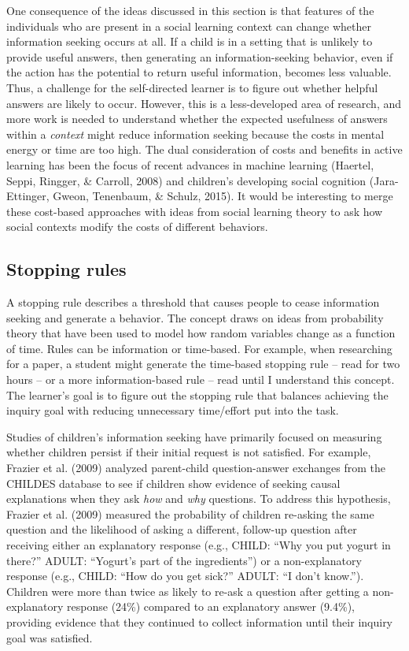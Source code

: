 \documentclass[english,floatsintext,man]{apa6}
\theoremstyle{definition}
\theoremstyle{definition}
\theoremstyle{definition}
\theoremstyle{remark}
\begin{document}
One consequence of the ideas discussed in this section is that features
of the individuals who are present in a social learning context can
change whether information seeking occurs at all. If a child is in a
setting that is unlikely to provide useful answers, then generating an
information-seeking behavior, even if the action has the potential to
return useful information, becomes less valuable. Thus, a challenge for
the self-directed learner is to figure out whether helpful answers are
likely to occur. However, this is a less-developed area of research, and
more work is needed to understand whether the expected usefulness of
answers within a \emph{context} might reduce information seeking because
the costs in mental energy or time are too high. The dual consideration
of costs and benefits in active learning has been the focus of recent
advances in machine learning (Haertel, Seppi, Ringger, \& Carroll, 2008)
and children's developing social cognition (Jara-Ettinger, Gweon,
Tenenbaum, \& Schulz, 2015). It would be interesting to merge these
cost-based approaches with ideas from social learning theory to ask how
social contexts modify the costs of different behaviors.

\subsection{Stopping rules}\label{stopping-rules}

A stopping rule describes a threshold that causes people to cease
information seeking and generate a behavior. The concept draws on ideas
from probability theory that have been used to model how random
variables change as a function of time. Rules can be information or
time-based. For example, when researching for a paper, a student might
generate the time-based stopping rule -- read for two hours -- or a more
information-based rule -- read until I understand this concept. The
learner's goal is to figure out the stopping rule that balances
achieving the inquiry goal with reducing unnecessary time/effort put
into the task.

Studies of children's information seeking have primarily focused on
measuring whether children persist if their initial request is not
satisfied. For example, Frazier et al. (2009) analyzed parent-child
question-answer exchanges from the CHILDES database to see if children
show evidence of seeking causal explanations when they ask \emph{how}
and \emph{why} questions. To address this hypothesis, Frazier et al.
(2009) measured the probability of children re-asking the same question
and the likelihood of asking a different, follow-up question after
receiving either an explanatory response (e.g., CHILD: \enquote{Why you
put yogurt in there?} ADULT: \enquote{Yogurt's part of the ingredients})
or a non-explanatory response (e.g., CHILD: \enquote{How do you get
sick?} ADULT: \enquote{I don't know.}). Children were more than twice as
likely to re-ask a question after getting a non-explanatory response
(24\%) compared to an explanatory answer (9.4\%), providing evidence
that they continued to collect information until their inquiry goal was
satisfied.
\end{document}
